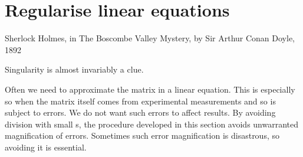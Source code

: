 

\section{Regularise linear equations}
\label{sec:rle}
\secttoc

\begin{quoted}{\parbox{15em}{Sherlock Holmes, in The Boscombe Valley Mystery, by Sir Arthur Conan Doyle, 1892}}
Singularity is almost invariably a clue.
\end{quoted}


Often we need to approximate the matrix in a linear equation.  
This is especially so when the matrix itself comes from experimental measurements and so is subject to errors.
We do not want such errors to affect results.
By avoiding division with small s, the procedure developed in this section avoids unwarranted magnification of errors.
Sometimes such error magnification is disastrous, so avoiding it is essential.

